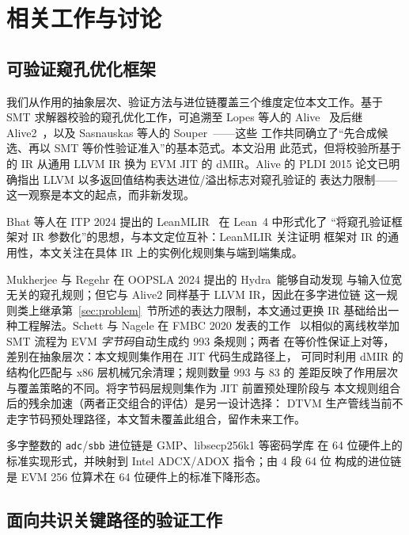 \section{相关工作与讨论}
\label{sec:related}

\subsection{可验证窥孔优化框架}

我们从作用的抽象层次、验证方法与进位链覆盖三个维度定位本文工作。基于 SMT
求解器校验的窥孔优化工作，可追溯至 Lopes 等人的 Alive~\cite{alive} 及后继
Alive2~\cite{alive2}，以及 Sasnauskas 等人的 Souper~\cite{souper}——这些
工作共同确立了``先合成候选、再以 SMT 等价性验证准入''的基本范式。本文沿用
此范式，但将校验所基于的 IR 从通用 LLVM IR 换为 EVM JIT 的 dMIR。Alive 的
PLDI 2015 论文已明确指出 LLVM 以多返回值结构表达进位/溢出标志对窥孔验证的
表达力限制——这一观察是本文的起点，而非新发现。

Bhat 等人在 ITP 2024 提出的 LeanMLIR~\cite{leanmlir} 在 Lean~4 中形式化了
``将窥孔验证框架对 IR 参数化''的思想，与本文定位互补：LeanMLIR 关注证明
框架对 IR 的通用性，本文关注在具体 IR 上的实例化规则集与端到端集成。

Mukherjee 与 Regehr 在 OOPSLA 2024 提出的 Hydra~\cite{hydra}能够自动发现
与输入位宽无关的窥孔规则；但它与 Alive2 同样基于 LLVM IR，因此在多字进位链
这一规则类上继承第~\ref{sec:problem}~节所述的表达力限制，本文通过更换 IR
基础给出一种工程解法。Schett 与 Nagele 在 FMBC 2020 发表的工作~\cite{fmbc20_evm_peephole}
以相似的离线枚举加 SMT 流程为 EVM \emph{字节码}自动生成约 993 条规则；两者
在等价性保证上对等，差别在抽象层次：本文规则集作用在 JIT 代码生成路径上，
可同时利用 dMIR 的结构化匹配与 x86 层机械冗余清理；规则数量 993 与 83 的
差距反映了作用层次与覆盖策略的不同。将字节码层规则集作为 JIT 前置预处理阶段与
本文规则组合后的残余加速（两者正交组合的评估）是另一设计选择：
DTVM 生产管线当前不走字节码预处理路径，本文暂未覆盖此组合，留作未来工作。

多字整数的 \texttt{adc}/\texttt{sbb} 进位链是 GMP、libsecp256k1 等密码学库
在 64 位硬件上的标准实现形式，并映射到 Intel ADCX/ADOX 指令；由 4 段 64 位
构成的进位链是 EVM 256 位算术在 64 位硬件上的标准下降形态。

\subsection{面向共识关键路径的验证工作}

